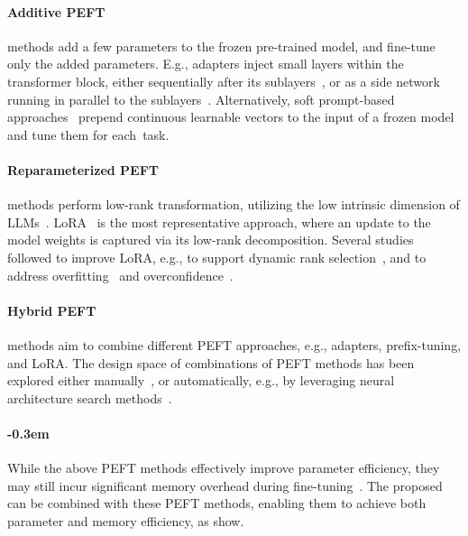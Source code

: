 \paragraph{Additive PEFT} methods add a few parameters to the frozen pre-trained model, 
and fine-tune only the added parameters. E.g., adapters inject small layers within the transformer block,
either sequentially after its sublayers~\citep{DBLP:conf/icml/HoulsbyGJMLGAG19,DBLP:conf/eacl/PfeifferKRCG21}, or as a side network running in parallel to the sublayers~\citep{DBLP:conf/iclr/HeZMBN22,DBLP:conf/emnlp/ZhuFZWL21}.
Alternatively, soft prompt-based approaches~\citep{DBLP:conf/acl/LiL20,qin_21,liu_21} 
prepend continuous learnable vectors to the input of a frozen model and tune them for each~task.

\paragraph{Reparameterized PEFT} methods perform low-rank transformation,
utilizing the low intrinsic dimension of LLMs~\citep{DBLP:conf/acl/AghajanyanGZ20}.  LoRA~\citep{hu_22} is the most representative approach, 
where an update to the model weights is captured via its low-rank decomposition.
Several studies followed to improve LoRA, e.g., 
to support dynamic rank selection~\citep{DBLP:conf/eacl/ValipourRKG23,DBLP:conf/iclr/ZhangCBH0CZ23}, and to address overfitting~\citep{DBLP:journals/corr/abs-2404-09610} and overconfidence~\citep{DBLP:conf/iclr/YangRWA24}.  

\paragraph{Hybrid PEFT} methods aim to combine different PEFT approaches, e.g.,
adapters, prefix-tuning, and LoRA.
The design space of combinations of PEFT methods has been explored
either manually~\citep{DBLP:conf/iclr/HeZMBN22,DBLP:conf/acl/MaoMHAM0YK22}, or automatically, e.g., by leveraging neural architecture search methods~\citep{DBLP:journals/corr/abs-2206-04673,DBLP:journals/tacl/ZhouWVK24}. 

\paragraph{\kern-0.3em}
While the above PEFT methods effectively improve parameter efficiency,
they may still incur significant memory overhead during fine-tuning~\citep{sung2022lst,DBLP:conf/emnlp/JinZZ23}.
The proposed \method can be combined with these PEFT methods,
enabling them to achieve both parameter and memory efficiency,
as  show.





